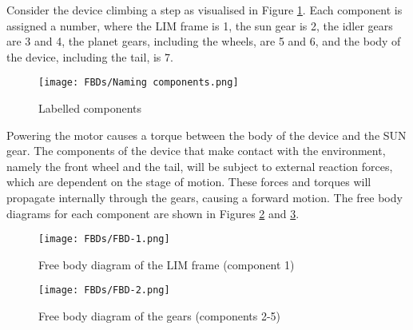 Consider the device climbing a step as visualised in Figure \ref{Component-names}. Each component is assigned a number, where the LIM frame is 1, the sun gear is 2, the idler gears are 3 and 4, the planet gears, including the wheels, are 5 and 6, and the body of the device, including the tail, is 7.
\begin{figure}[h]
	\centering
	\texttt{[image: FBDs/Naming components.png]}
	\caption{Labelled components}
	\label{Component-names}
\end{figure}
Powering the motor causes a torque between the body of the device and the SUN gear. The components of the device that make contact with the environment, namely the front wheel and the tail, will be subject to external reaction forces, which are dependent on the stage of motion. These forces and torques will propagate internally through the gears, causing a forward motion. The free body diagrams for each component are shown in Figures \ref{FBD-1} and \ref{FBD-2}.\\
\begin{figure}[h]
	\centering
	\texttt{[image: FBDs/FBD-1.png]}
	\caption{Free body diagram of the LIM frame (component 1)}
	\label{FBD-1}
\end{figure}
\begin{figure}[!h]
	\centering
	\texttt{[image: FBDs/FBD-2.png]}
	\caption{Free body diagram of the gears (components 2-5)}
	\label{FBD-2}
\end{figure}

